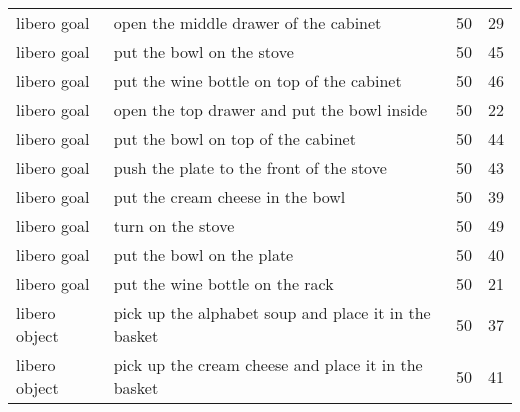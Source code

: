 \begin{table}[]
\begin{tabular}{llll}
libero goal   & open the middle drawer of the cabinet                                                    & 50         & 29                                                              \\
libero goal   & put the bowl on the stove                                                                & 50         & 45                                                              \\
libero goal   & put the wine bottle on top of the cabinet                                                & 50         & 46                                                              \\
libero goal   & open the top drawer and put the bowl inside                                              & 50         & 22                                                              \\
libero goal   & put the bowl on top of the cabinet                                                       & 50         & 44                                                              \\
libero goal   & push the plate to the front of the stove                                                 & 50         & 43                                                              \\
libero goal   & put the cream cheese in the bowl                                                         & 50         & 39                                                              \\
libero goal   & turn on the stove                                                                        & 50         & 49                                                              \\
libero goal   & put the bowl on the plate                                                                & 50         & 40                                                              \\
libero goal   & put the wine bottle on the rack                                                          & 50         & 21                                                              \\
libero object & pick up the alphabet soup and place it in the basket                                     & 50         & 37                                                              \\
libero object & pick up the cream cheese and place it in the basket                                      & 50         & 41                                                              \\

\end{tabular}
\end{table}
